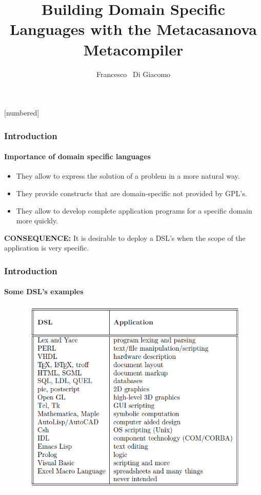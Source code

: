 \documentclass[mathserif,serif]{beamer}
\begin{document}
\newtheorem{proposition}{Proposition}
[numbered]

\author[Di Giacomo]
{Francesco ~Di Giacomo}
\date{}
\title{Building Domain Specific Languages with the Metacasanova Metacompiler}

\frame{\titlepage}

\begin{frame}
	\frametitle{Introduction}
	\framesubtitle{Importance of domain specific languages}
	\begin{itemize}
		\item They allow to express the solution of a problem in a more natural way.
		\item They provide constructs that are domain-specific not provided by GPL's.
		\item They allow to develop complete application programs for a specific domain more quickly.
	\end{itemize}
	
	\pause
	\textbf{CONSEQUENCE:} It is desirable to deploy a DSL's when the scope of the application is very specific.
	
\end{frame}

\begin{frame}
	\frametitle{Introduction}
	\framesubtitle{Some DSL's examples}
	
	\begin{figure}
		\centering
		\includegraphics[scale=0.5]{Figures/dsl_table}
	\end{figure}	
\end{frame}
\end{document}
